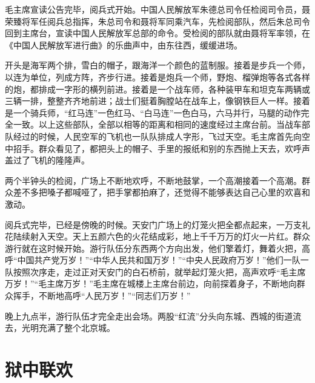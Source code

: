 \documentclass[12pt,UTF-8,openany]{ctexbook}
\begin{document}
\begin{Large}
    毛主席宣读公告完毕，阅兵式开始。中国人民解放军朱德总司令任检阅司令员，聂荣臻将军任阅兵总指挥，朱总司令和聂将军同乘汽车，先检阅部队，然后朱总司令回到主席台，宣读中国人民解放军总部的命令。受检阅的部队就由聂将军率领，在《中国人民解放军进行曲》的乐曲声中，由东往西，缓缓进场。
    
    开头是海军两个排，雪白的帽子，跟海洋一个颜色的蓝制服。接着是步兵一个师，以连为单位，列成方阵，齐步行进。接着是炮兵一个师，野炮、榴弹炮等各式各样的炮，都排成一字形的横列前进。接着是一个战车师，各种装甲车和坦克车两辆或三辆一排，整整齐齐地前进；战士们挺着胸膛站在战车上，像钢铁巨人一样。接着是一个骑兵师，“红马连”一色红马、“白马连”一色白马，六马并行，马腿的动作完全一致。以上这些部队，全部以相等的距离和相同的速度经过主席台前。当战车部队经过的时候，人民空军的飞机也一队队排成人字形，飞过天空。毛主席首先向空中招手。群众看见了，都把头上的帽子、手里的报纸和别的东西抛上天去，欢呼声盖过了飞机的隆隆声。
    
    两个半钟头的检阅，广场上不断地欢呼，不断地鼓掌，一个高潮接着一个高潮。群众差不多把嗓子都喊哑了，把手掌都拍麻了，还觉得不能够表达自己心里的欢喜和激动。
    
    阅兵式完毕，已经是傍晚的时候。天安门广场上的灯笼火把全都点起来，一万支礼花陆续射入天空。天上五颜六色的火花结成彩，地上千千万万的灯火一片红。群众游行就在这时候开始。游行队伍分东西两个方向出发，他们擎着灯，舞着火把，高呼“中国共产党万岁！”“中华人民共和国万岁！”“中央人民政府万岁！”他们一队一队按照次序走，走过正对天安门的白石桥前，就举起灯笼火把，高声欢呼“毛主席万岁！”“毛主席万岁！”毛主席在城楼上主席台前边，向前探着身子，不断地向群众挥手，不断地高呼“人民万岁！”“同志们万岁！”
    
    晚上九点半，游行队伍才完全走出会场。两股“红流”分头向东城、西城的街道流去，光明充满了整个北京城。
    
\end{Large}

\chapter{狱中联欢}
\end{document}
